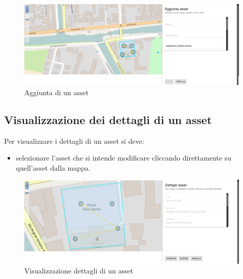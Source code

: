 	\begin{figure}[H]
	\centering
	\includegraphics[width=\textwidth]{img/aggiunta_asset.png}
	\caption{Aggiunta di un asset}
	\end{figure}

\subsection{Visualizzazione dei dettagli di un asset}
	Per visualizzare i dettagli di un asset si deve:
	\begin{itemize}
		\item selezionare l'asset che si intende modificare cliccando direttamente su quell'asset dalla mappa.
	\end{itemize}
	
	\begin{figure}[H]
	\centering
	\includegraphics[width=\textwidth]{img/visualizzazione_asset.png}
	\caption{Visualizzazione dettagli di un asset}
	\end{figure}

